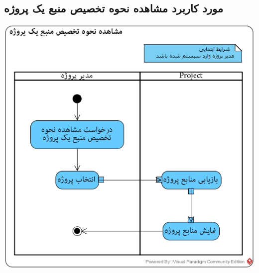 \subsection*{مورد کاربرد مشاهده نحوه تخصیص منبع یک پروژه}
\vspace{2cm}
\begin{center}
\includegraphics[width=\textwidth]{ActivityDiagramsWithSwimlanes/38.jpg}
\end{center}

\newpage
\vspace{2cm}
